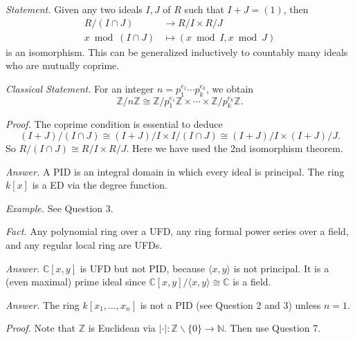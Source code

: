 \documentclass{mathproblems}
\newcommand\C{\mathbb{C}}
\newcommand\Z{\mathbb{Z}}
\begin{document}
\begin{questions}

\textit{Statement.} Given any two ideals $I,J$ of $R$ such that $I+J=(1)$, then
$$
\begin{aligned}
R/(I\cap J) & \longrightarrow R/I \times R/J\\
x\bmod (I\cap J) & \longmapsto (x \bmod I, x\bmod J)
\end{aligned}
$$
is an isomorphism. This can be generalized inductively to countably many ideals who are mutually coprime.

\textit{Classical Statement.} For an integer $n=p_1^{e_1}\cdots p_k^{e_k}$, we obtain
$$
\Z/n\Z\cong \Z/p_1^{e_1}\Z\times \cdots \times \Z/p_k^{e_k}\Z.
$$

\textit{Proof.} The coprime condition is essential to deduce
$$
(I+J)/(I\cap J)\cong (I+J)/I\times I/(I\cap J)\cong (I+J)/I\times (I+J)/J.
$$
So $R/(I\cap J)\cong R/I \times R/J$. Here we have used the 2nd isomorphism theorem.


\textit{Answer.} A PID is an integral domain in which every ideal is principal. The ring $k[x]$ is a ED via the degree function.

\textit{Example.} See Question 3.

{\color{violet} \textit{Fact.} Any polynomial ring over a UFD, any ring formal power series over a field, and any regular local ring are UFDs.}


\textit{Answer.} $\mathbb{C}[x,y]$ is UFD but not PID, because $\langle x, y \rangle$ is not principal. It is a (even maximal) prime ideal since $\C[x,y]/\langle x, y \rangle\cong \C$ is a field.


\textit{Answer.} The ring $k[x_1,\ldots,x_n]$ is not a PID (see Question 2 and 3) unless $n=1$.


\textit{Proof.} Note that $\Z$ is Euclidean via $|\cdot|:\Z\backslash \{0\}\to \mathbb{N}$. Then use Question 7.


\end{questions}
\end{document}
